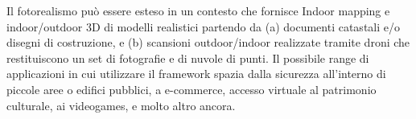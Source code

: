 Il fotorealismo può essere esteso in un contesto che fornisce Indoor mapping e indoor/outdoor 3D di modelli realistici
partendo da (a) documenti catastali e/o disegni di costruzione, e (b) scansioni outdoor/indoor realizzate tramite droni
che restituiscono un set di fotografie e di nuvole di punti.
Il possibile range di applicazioni in cui utilizzare il framework spazia dalla sicurezza all'interno di piccole aree o edifici pubblici, a e-commerce,
accesso virtuale al patrimonio culturale, ai videogames, e molto altro ancora.
\newpage
